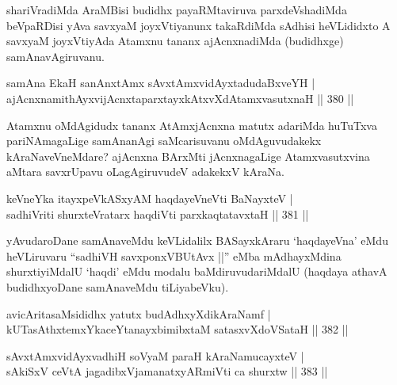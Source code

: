 \begin{artha}
shariVradiMda AraMBisi budidhx payaRMtaviruva parxdeVshadiMda beVpaRDisi yAva savxyaM joyxVtiyanunx takaRdiMda sAdhisi heVLididxto A savxyaM joyxVtiyAda Atamxnu tananx ajAcnxnadiMda (budidhxge) samAnavAgiruvanu.
\end{artha}

\begin{shl}
samAna EkaH sanAnxtAmx sAvxtAmxvidAyxtadudaBxveYH | \\
ajAcnxnamithAyxvijAcnxtaparxtayxkAtxvXdAtamxvasutxnaH \hfill||  380 ||  
\end{shl}

\begin{artha}
Atamxnu oMdAgidudx tananx AtAmxjAcnxna matutx adariMda huTuTxva pariNAmagaLige samAnanAgi saMcarisuvanu oMdAguvudakekx kAraNaveVneMdare? ajAcnxna BArxMti jAcnxnagaLige Atamxvasutxvina aMtara savxrUpavu oLagAgiruvudeV adakekxV kAraNa.
\end{artha}


\begin{shl}
keVneYka itayxpeVkASxyAM haqdayeVneVti BaNayxteV | \\
sadhiVriti shurxteVratarx haqdiVti parxkaqtatavxtaH \hfill||  381 ||  
\end{shl}

\begin{artha}
yAvudaroDane samAnaveMdu keVLidalilx BASayxkAraru `haqdayeVna' eMdu heVLiruvaru ``sadhiVH savxponxVBUtAvx ||''  eMba mAdhayxMdina shurxtiyiMdalU `haqdi' eMdu modalu baMdiruvudariMdalU (haqdaya athavA budidhxyoDane samAnaveMdu tiLiyabeVku).
\end{artha}


\begin{shl}
avicAritasaMsididhx yatutx budAdhxyXdikAraNamf | \\
kUTasAthxtemxYkaceYtanayxbimibxtaM satasxvXdoVSataH \hfill||  382 || 
\end{shl}
				
\begin{shl}
sAvxtAmxvidAyxvadhiH soV\s yaM paraH kAraNamucayxteV | \\
sAkiSxV ceVtA jagadibxVjamanatxyARmiVti ca shurxtw \hfill||  383 ||  
\end{shl}

